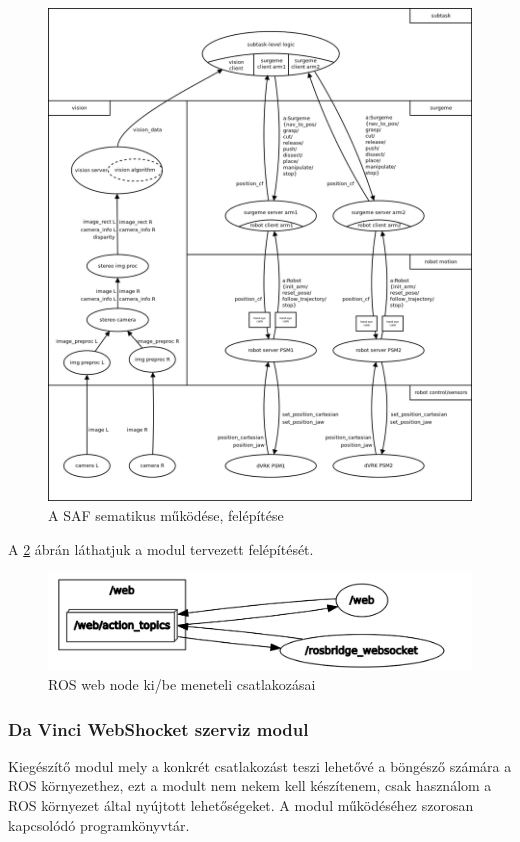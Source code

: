 \documentclass[12pt,a4paper,oneside]{report} %
\begin{document}
\begin{figure}[H]
	\label{fig:irob}
	\begin{center}
		\includegraphics[width=14cm]{irobArch}
		\caption{A SAF sematikus működése, felépítése \cite{Abc-irobotics2020May} }
	\end{center}
\end{figure}
A \ref{fig:irob_web} ábrán láthatjuk a modul tervezett felépítését.
\begin{figure}[H]
	\centering
	\label{fig:irob_web}
	\includegraphics[width=14cm]{irob_web}
	\caption{ROS web node ki/be meneteli csatlakozásai}
\end{figure}


\subsubsection{Da Vinci WebShocket szerviz modul}
Kiegészítő modul mely a konkrét csatlakozást teszi lehetővé a böngésző számára a ROS környezethez, ezt a modult nem nekem kell készítenem, csak használom a ROS környezet által nyújtott lehetőségeket.
A modul működéséhez szorosan kapcsolódó programkönyvtár.
\end{document}
